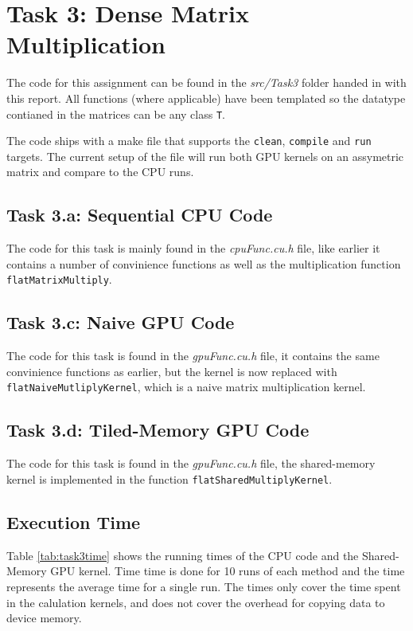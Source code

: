 \section{Task 3: Dense Matrix Multiplication}
The code for this assignment can be found in the \textit{src/Task3} folder
handed in with this report. All functions (where applicable) have been templated
so the datatype contianed in the matrices can be any class \texttt{T}.

The code ships with a make file that supports the \texttt{clean},
\texttt{compile} and \texttt{run} targets. The current setup of the file will
run both GPU kernels on an assymetric matrix and compare to the CPU runs.

\subsection{Task 3.a: Sequential CPU Code}
The code for this task is mainly found in the \textit{cpuFunc.cu.h} file, like
earlier it contains a number of convinience functions as well as the
multiplication function \texttt{flatMatrixMultiply}.

\subsection{Task 3.c: Naive GPU Code}
The code for this task is found in the \textit{gpuFunc.cu.h} file, it contains
the same convinience functions as earlier, but the kernel is now replaced with
\texttt{flatNaiveMutliplyKernel}, which is a naive matrix multiplication kernel.

\subsection{Task 3.d: Tiled-Memory GPU Code}
The code for this task is found in the \textit{gpuFunc.cu.h} file, the
shared-memory kernel is implemented in the function
\texttt{flatSharedMultiplyKernel}.

\subsection{Execution Time}

Table \ref{tab:task3time} shows the running times of the CPU code and the
Shared-Memory GPU kernel. Time time is done for 10 runs of each method and the
time represents the average time for a single run. The times only cover the time
spent in the calulation kernels, and does not cover the overhead for copying
data to device memory.

